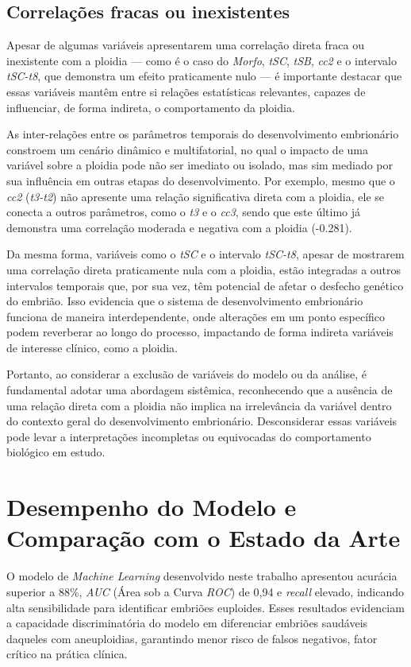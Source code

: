 \subsection{Correlações fracas ou inexistentes}
Apesar de algumas variáveis apresentarem uma correlação direta fraca ou inexistente com a ploidia — como é o caso do \textit{Morfo}, \textit{tSC}, \textit{tSB}, \textit{cc2} e o intervalo \textit{tSC-t8}, que demonstra um efeito praticamente nulo — é importante destacar que essas variáveis mantêm entre si relações estatísticas relevantes, capazes de influenciar, de forma indireta, o comportamento da ploidia. 

As inter-relações entre os parâmetros temporais do desenvolvimento embrionário constroem um cenário dinâmico e multifatorial, no qual o impacto de uma variável sobre a ploidia pode não ser imediato ou isolado, mas sim mediado por sua influência em outras etapas do desenvolvimento. Por exemplo, mesmo que o \textit{cc2} (\textit{t3-t2}) não apresente uma relação significativa direta com a ploidia, ele se conecta a outros parâmetros, como o \textit{t3} e o \textit{cc3}, sendo que este último já demonstra uma correlação moderada e negativa com a ploidia (-0.281).

Da mesma forma, variáveis como o \textit{tSC} e o intervalo \textit{tSC-t8}, apesar de mostrarem uma correlação direta praticamente nula com a ploidia, estão integradas a outros intervalos temporais que, por sua vez, têm potencial de afetar o desfecho genético do embrião. Isso evidencia que o sistema de desenvolvimento embrionário funciona de maneira interdependente, onde alterações em um ponto específico podem reverberar ao longo do processo, impactando de forma indireta variáveis de interesse clínico, como a ploidia.

Portanto, ao considerar a exclusão de variáveis do modelo ou da análise, é fundamental adotar uma abordagem sistêmica, reconhecendo que a ausência de uma relação direta com a ploidia não implica na irrelevância da variável dentro do contexto geral do desenvolvimento embrionário. Desconsiderar essas variáveis pode levar a interpretações incompletas ou equivocadas do comportamento biológico em estudo.

\section{Desempenho do Modelo e Comparação com o Estado da Arte}
O modelo de \textit{Machine Learning} desenvolvido neste trabalho apresentou acurácia superior a 88\%, \textit{AUC} (Área sob a Curva \textit{ROC}) de 0,94 e \textit{recall} elevado, indicando alta sensibilidade para identificar embriões euploides. Esses resultados evidenciam a capacidade discriminatória do modelo em diferenciar embriões saudáveis daqueles com aneuploidias, garantindo menor risco de falsos negativos, fator crítico na prática clínica.

